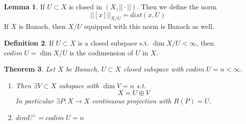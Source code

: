 \documentclass[a4paper, 12pt]{article}
\theoremstyle{plain}
\newtheorem{theorem}{Theorem}[subsection] %
\theoremstyle{definition}
\newtheorem{definition}[theorem]{Definition} %
\theoremstyle{lemma}
\newtheorem{lemma}[theorem]{Lemma}
\theoremstyle{remark}
\theoremstyle{corollary}
\theoremstyle{example}
\begin{document}
	\begin{lemma}
		If $U\subset X$ is closed in $(X,||\cdot||)$. Then we define the norm \[||[x]||_{X/U} = dist(x,U)\] If $X$ is Banach, then $X/U$ equipped with this norm is Banach as well.
	\end{lemma}
	\begin{definition}
		If $U\subset X$ is a closed subspace s.t. $\dim X/U < \infty$, then $codim \;U = \dim X/U$ is the codimension of $U$ in $X$.
	\end{definition}
	\begin{theorem}
		Let $X$ be Banach, $U\subset X$ closed subspace with $codim \;U = n < \infty$. \begin{enumerate}
			\item Then $\exists V \subset X$ subspace with $\dim V = n$ s.t. \[X = U\oplus V\] In particular $\exists P:X \to X$ continuous projection with $R(P) = U$.
			\item $dim U^\bot = codim \; U = n$
		\end{enumerate}
	\end{theorem}
\end{document}
